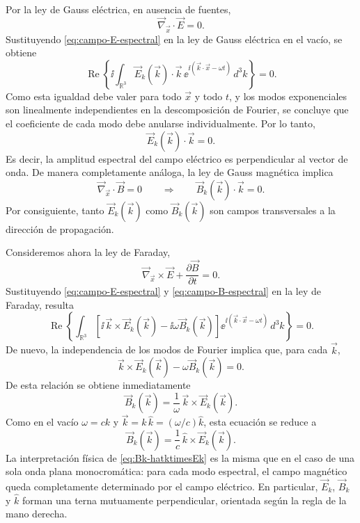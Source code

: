 \documentclass[../main.tex]{subfiles}
\begin{document}
Por la ley de Gauss eléctrica, en ausencia de fuentes,
\begin{equation*}
    \vec\nabla_{\vec x}\cdot \vec E=0.
\end{equation*}
Sustituyendo \eqref{eq:campo-E-espectral} en la ley de Gauss eléctrica en el vacío, se obtiene
\begin{equation*}
    \operatorname{Re}\left\{
        \ii\int_{\mathbb R^3}\vec E_k(\vec k)\cdot\vec k\,\ee^{\ii(\vec k\cdot\vec x-\omega t)}\,d^3k
    \right\}=0.
\end{equation*}
Como esta igualdad debe valer para todo $\vec x$ y todo $t$, y los modos exponenciales son linealmente independientes en la descomposición de Fourier, se concluye que el coeficiente de cada modo debe anularse individualmente. Por lo tanto,
\begin{equation*}
    \vec E_k(\vec k)\cdot\vec k=0.
\end{equation*}
Es decir, la amplitud espectral del campo eléctrico es perpendicular al vector de onda. De manera completamente análoga, la ley de Gauss magnética implica
\begin{equation*}
    \vec\nabla_{\vec x}\cdot \vec B=0
    \qquad\Longrightarrow\qquad
    \vec B_k(\vec k)\cdot\vec k=0.
\end{equation*}
Por consiguiente, tanto $\vec E_k(\vec k)$ como $\vec B_k(\vec k)$ son campos transversales a la dirección de propagación.

Consideremos ahora la ley de Faraday,
\begin{equation*}
    \vec\nabla_{\vec x}\times \vec E+\frac{\partial \vec B}{\partial t}=0.
\end{equation*}
Sustituyendo \eqref{eq:campo-E-espectral} y \eqref{eq:campo-B-espectral} en la ley de Faraday, resulta
\begin{equation*}
    \operatorname{Re}\left\{
        \int_{\mathbb R^3}\left[\ii\,\vec k\times\vec E_k(\vec k)-\ii\omega\vec B_k(\vec k)\right]\ee^{\ii(\vec k\cdot\vec x-\omega t)}\,d^3k
    \right\}=0.
\end{equation*}
De nuevo, la independencia de los modos de Fourier implica que, para cada $\vec k$,
\begin{equation*}
    \vec k\times\vec E_k(\vec k)-\omega\vec B_k(\vec k)=0.
\end{equation*}
De esta relación se obtiene inmediatamente
\begin{equation*}
    \vec B_k(\vec k)=\frac{1}{\omega}\,\vec k\times\vec E_k(\vec k).
\end{equation*}
Como en el vacío $\omega=ck$ y $\vec k=k\,\hat k=(\omega/c)\hat k$, esta ecuación se reduce a
\begin{equation}
    \vec B_k(\vec k)=\frac{1}{c}\,\hat k\times \vec E_k(\vec k).
    \label{eq:Bk-hatktimesEk}
\end{equation}
La interpretación física de \eqref{eq:Bk-hatktimesEk} es la misma que en el caso de una sola onda plana monocromática: para cada modo espectral, el campo magnético queda completamente determinado por el campo eléctrico. En particular, $\vec E_k$, $\vec B_k$ y $\hat k$ forman una terna mutuamente perpendicular, orientada según la regla de la mano derecha.
\end{document}
